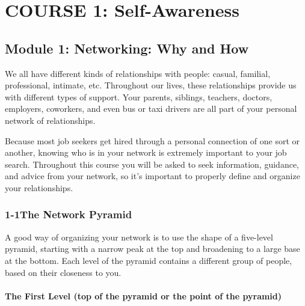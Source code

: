\hypertarget{course1}{}\chapter*{COURSE 1: Self-Awareness}\label{course1}

\noindent\makebox[\textwidth]{\rule{\linewidth}{0.4pt}}
\localtableofcontents
\noindent\makebox[\textwidth]{\rule{\linewidth}{0.4pt}}
\pagebreak \section*{Module 1: Networking: Why and How} 
\noindent\makebox[\textwidth]{\rule{\linewidth}{0.4pt}} 
\localtableofcontents
\noindent\makebox[\textwidth]{\rule{\linewidth}{0.4pt}}

\leftskip=0.5cm
We all have different kinds of relationships with people: casual, familial, professional, intimate, etc. Throughout our lives, these relationships provide us with different types of support. Your parents, siblings, teachers, doctors, employers, coworkers, and even bus or taxi drivers are all part of your personal network of relationships.

Because most job seekers get hired through a personal connection of one sort or another, knowing who is in your network is extremely important to your job search. Throughout this course you will be asked to seek information, guidance, and advice from your network, so it's important to properly define and organize your relationships.

\pagebreak \subsection*{1-1\quad The Network Pyramid}
A good way of organizing your network is to use the shape of a five-level pyramid, starting with a narrow peak at the top and broadening to a large base at the bottom. Each level of the pyramid contains a different group of people, based on their closeness to you.

\subsubsection*{The First Level (top of the pyramid or the point of the pyramid)}


